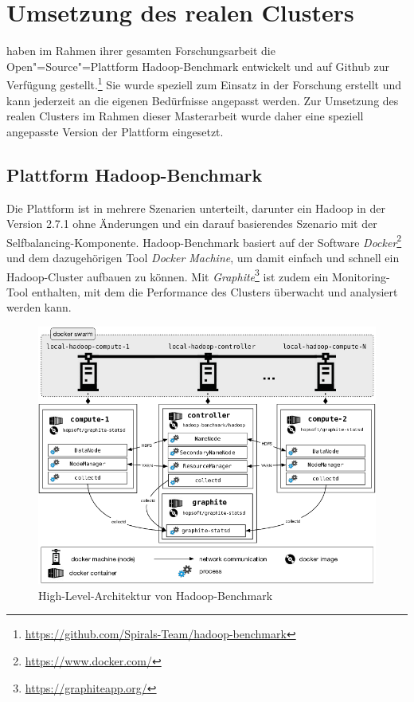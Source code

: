 \section{Umsetzung des realen Clusters}\label{sec:aufbauCluster}

\citeauthor{zhang2016} haben im Rahmen ihrer gesamten Forschungsarbeit die Open"=Source"=Plattform Hadoop-Benchmark entwickelt und auf Github zur Verfügung gestellt.\footnote{\url{https://github.com/Spirals-Team/hadoop-benchmark}} Sie wurde speziell zum Einsatz in der Forschung erstellt und kann jederzeit an die eigenen Bedürfnisse angepasst werden. Zur Umsetzung des realen Clusters im Rahmen dieser Masterarbeit wurde daher eine speziell angepasste Version der Plattform eingesetzt.

\subsection{Plattform Hadoop-Benchmark}\label{sec:hadoopBenchmark}

Die Plattform ist in mehrere Szenarien unterteilt, darunter ein Hadoop in der Version 2.7.1 ohne Änderungen und ein darauf basierendes Szenario mit der Selfbalancing-Komponente. Hadoop-Benchmark basiert auf der Software \emph{Docker}\footnote{\url{https://www.docker.com/}} und dem dazugehörigen Tool \emph{Docker Machine}, um damit einfach und schnell ein Hadoop-Cluster aufbauen zu können. Mit \emph{Graphite}\footnote{\url{https://graphiteapp.org/}} ist zudem ein Monitoring-Tool enthalten, mit dem die Performance des Clusters überwacht und analysiert werden kann.

\begin{figure}
    \includegraphics{./images/hadoopBenchmarkArch.png}
    \caption[High-Level-Architektur von Hadoop-Benchmark]{High-Level-Architektur von Hadoop-Benchmark \cite{abb:hadoopBenchmarkArch}}
    \label{fig:hadoopBenchmarkArchitecture}
\end{figure}

